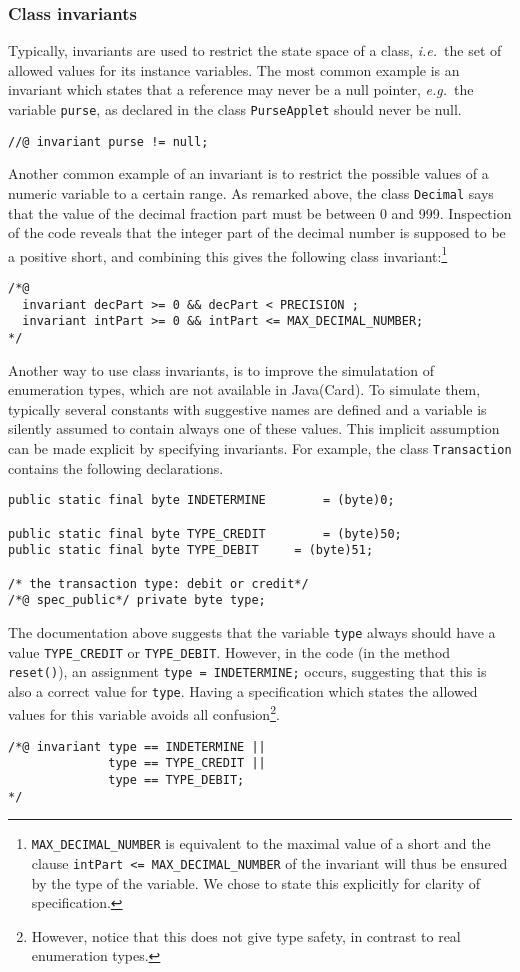 \documentclass[a4paper]{llncs}
\begin{document}
\subsubsection{Class invariants}
Typically, invariants are used to restrict the state space of a class,
\emph{i.e.}~the set of allowed values for its instance variables. The
most common example is an invariant which states that a reference may
never be a null pointer, \emph{e.g.}~the variable
\texttt{purse}, as declared in the class \texttt{PurseApplet}
should never be null.
\begin{verbatim}
//@ invariant purse != null;
\end{verbatim}
Another common example of an invariant is to restrict the possible
values of a numeric variable to a certain range. As remarked above,
the class \texttt{Decimal} says that the value of the decimal fraction
part must be between 0 and 999. Inspection of the code reveals that
the integer part of the decimal number is supposed to be a positive
short, and combining this gives the following class
invariant:\footnote{\texttt{MAX\_DECIMAL\_NUMBER} is equivalent to the
maximal value of a short and the clause \texttt{intPart <=
MAX\_DECIMAL\_NUMBER} of the invariant will thus be ensured by the
type of the variable. We chose to state this explicitly for clarity of
specification.}
\begin{verbatim}
/*@
  invariant decPart >= 0 && decPart < PRECISION ;
  invariant intPart >= 0 && intPart <= MAX_DECIMAL_NUMBER;
*/
\end{verbatim}

Another way to use class invariants, is to improve the simulatation of
enumeration types, which are not available in Java(Card).  To simulate
them, typically several constants with suggestive names are defined
and a variable is silently assumed to contain always one of these
values. This implicit assumption can be made explicit by specifying
invariants. For example, the class \texttt{Transaction} contains the
following declarations.
\begin{verbatim}
public static final byte INDETERMINE		= (byte)0;

public static final byte TYPE_CREDIT		= (byte)50;
public static final byte TYPE_DEBIT		= (byte)51;
    
/* the transaction type: debit or credit*/
/*@ spec_public*/ private byte type;
\end{verbatim}

The documentation above suggests that the variable \texttt{type}
always should have a value \texttt{TYPE\_CREDIT} or
\texttt{TYPE\_DEBIT}. However, in the code (in the method
\texttt{reset()}), an assignment \texttt{type = INDETERMINE;} occurs,
suggesting that this is also a correct value for
\texttt{type}. Having a specification which states the allowed values
for this variable avoids all confusion\footnote{However, notice that
this does not give type safety, in contrast to real enumeration types.}.
\begin{verbatim}
/*@ invariant type == INDETERMINE ||
              type == TYPE_CREDIT || 
              type == TYPE_DEBIT;
*/
\end{verbatim}
\end{document}
